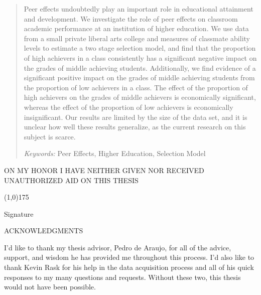 \begin{abstract}
  \noindent 
Peer effects undoubtedly play an important role in educational attainment and development. 
We investigate the role of peer effects on classroom academic performance at an institution of higher education. 
We use data from a small private liberal arts college and measures of classmate ability levels to estimate a two stage selection model, and find that the proportion of high achievers in a class consistently has a significant negative impact on the grades of middle achieving students.
Additionally, we find evidence of a  significant positive impact on the grades of middle achieving students from the proportion of low achievers in a class. 
The effect of the proportion of high achievers on the grades of middle achievers is economically significant, whereas the effect of the proportion of low achievers is economically insignificant. 
Our results are limited by the size of the data set, and it is unclear how well these results generalize, as the current research on this subject is scarce. 

\bigskip

\noindent \emph{Keywords: }Peer Effects, Higher Education, Selection Model

\end{abstract}

\newpage{}

\vspace*{7cm}
\begin{changemargin}{1.75cm}{1.75cm}
  ON MY HONOR I HAVE NEITHER GIVEN NOR RECEIVED UNAUTHORIZED AID ON THIS THESIS
\end{changemargin}
\vspace{7cm}
\begin{changemargin}{9cm}{1.75cm}
  \begin{center}
    \line(1,0){175}
  \end{center}
  \vspace{-.5cm}
  Signature
\end{changemargin}

\newpage{}

\begin{center}
  \LARGE ACKNOWLEDGMENTS
\end{center}

I'd like to thank my thesis advisor, Pedro de Araujo, for all of the advice, support, and wisdom he has provided me throughout this process. I'd also like to thank Kevin Rask for his help in the data acquisition process and all of his quick responses to my many questions and requests. Without these two, this thesis would not have been possible. 

\newpage{}

\thispagestyle{plain}
\tableofcontents

\newpage
